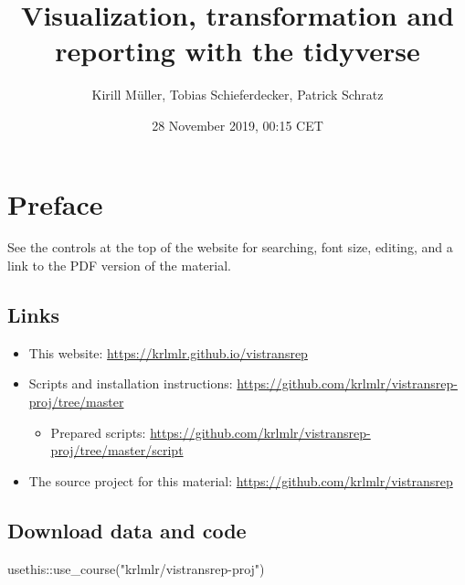\documentclass[]{book}
\title{Visualization, transformation and reporting with the tidyverse}
\author{Kirill Müller, Tobias Schieferdecker, Patrick Schratz}
\date{28 November 2019, 00:15 CET}
\newenvironment{Shaded}{}{}
\newcommand{\KeywordTok}[1]{\textcolor[rgb]{0.00,0.00,1.00}{#1}}
\newcommand{\NormalTok}[1]{#1}
\newcommand{\OperatorTok}[1]{#1}
\newcommand{\StringTok}[1]{\textcolor[rgb]{0.00,0.50,0.50}{#1}}
\providecommand{\tightlist}{%
  \setlength{\itemsep}{0pt}\setlength{\parskip}{0pt}}
\begin{document}
\maketitle

{
\setcounter{tocdepth}{1}
\tableofcontents
}
\hypertarget{preface}{%
\chapter*{Preface}\label{preface}}

See the controls at the top of the website for searching, font size, editing, and a link to the PDF version of the material.

\hypertarget{links}{%
\section*{Links}\label{links}}

\begin{itemize}
\item
  This website: \url{https://krlmlr.github.io/vistransrep}
\item
  Scripts and installation instructions: \url{https://github.com/krlmlr/vistransrep-proj/tree/master}

  \begin{itemize}
  \tightlist
  \item
    Prepared scripts: \url{https://github.com/krlmlr/vistransrep-proj/tree/master/script}
  \end{itemize}
\item
  The source project for this material: \url{https://github.com/krlmlr/vistransrep}
\end{itemize}

\hypertarget{download-data-and-code}{%
\section*{Download data and code}\label{download-data-and-code}}

\begin{Shaded}
\begin{Highlighting}[]
\NormalTok{usethis}\OperatorTok{::}\KeywordTok{use_course}\NormalTok{(}\StringTok{"krlmlr/vistransrep-proj"}\NormalTok{)}
\end{Highlighting}
\end{Shaded}
\end{document}
